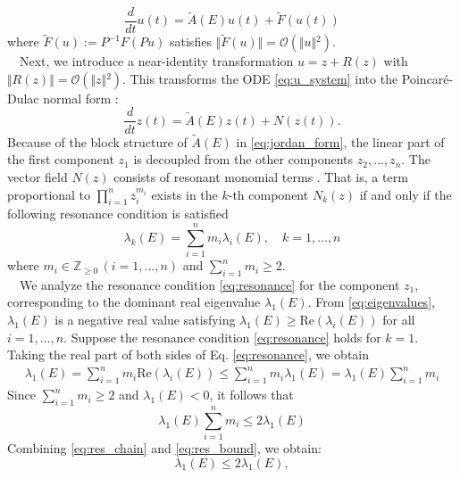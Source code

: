 \documentclass[11pt,a4paper]{article}
\begin{document}
\begin{equation}
\frac{d}{dt}u(t) = \tilde{A}(E)u(t) + \tilde{F}(u(t)) \label{eq:u_system}
\end{equation}
where $\tilde{F}(u) := P^{-1} F(P u)$ satisfies $\Vert{}\tilde{F}(u)\Vert{} = \mathcal{O}(\Vert{}u\Vert{}^2)$.\\
~~Next, we introduce a near-identity transformation $u = z + R(z)$ with $\Vert{}R(z)\Vert{} = \mathcal{O}(\Vert{}z\Vert{}^2)$. This transforms the ODE \eqref{eq:u_system} into the Poincar\'e-Dulac normal form \cite{LawrencePerko}:
\begin{equation}
\frac{d}{dt}z(t)= \tilde{A}(E)z(t) + N(z(t)). \label{eq:normal_form}
\end{equation}
Because of the block structure of $\tilde{A}(E)$ in \eqref{eq:jordan_form}, the linear part of the first component $z_1$ is decoupled from the other components $z_2,\ldots,z_n$. The vector field $N(z)$ consists of resonant monomial terms \cite{LawrencePerko}. That is, a term proportional to $\prod_{i=1}^n z_i^{m_i}$ exists in the $k$-th component $N_k(z)$ if and only if the following resonance condition is satisfied
\begin{equation}
\lambda_k(E) = \sum_{i=1}^n m_i \lambda_i(E),\quad k=1,\ldots,n \label{eq:resonance}
\end{equation}
where $m_i \in \mathbb{Z}_{\ge 0}\,(i=1,\ldots,n)$ and $\sum_{i=1}^n m_i \ge 2$. \\
~~We analyze the resonance condition \eqref{eq:resonance} for the component $z_1$, corresponding to the dominant real eigenvalue $\lambda_1(E)$. From \eqref{eq:eigenvalues}, $\lambda_1(E)$ is a negative real value satisfying $\lambda_1(E) \ge \mathrm{Re}(\lambda_i(E))$ for all $i=1,\ldots,n$. Suppose the resonance condition \eqref{eq:resonance} holds for $k=1$. Taking the real part of both sides of Eq. \eqref{eq:resonance}, we obtain
\begin{align}
\lambda_1(E) = \sum_{i=1}^n m_i \mathrm{Re}(\lambda_i(E))\le \sum_{i=1}^n m_i \lambda_1(E) = \lambda_1(E) \sum_{i=1}^n m_i \label{eq:res_chain}
\end{align}
Since $\sum_{i=1}^n m_i \ge 2$ and $\lambda_1(E) < 0$, it follows that
\begin{equation}
\lambda_1(E) \sum_{i=1}^n m_i \le 2\lambda_1(E) \label{eq:res_bound}
\end{equation}
Combining \eqref{eq:res_chain} and \eqref{eq:res_bound}, we obtain:
\begin{equation}
\lambda_1(E) \le 2\lambda_1(E), \label{eq:contradiction}
\end{equation}
\end{document}
